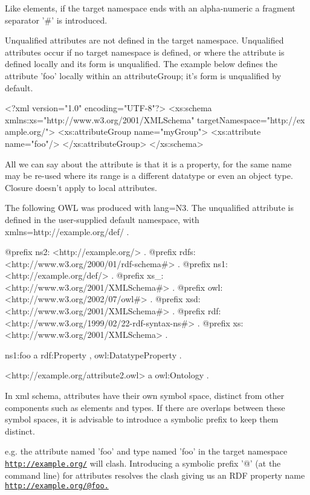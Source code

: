 Like elements, if the target namespace ends with an alpha-\/numeric a fragment separator '\#' is introduced.

Unqualified attributes are not defined in the target namespace. Unqualified attributes occur if no target namespace is defined, or where the attribute is defined locally and its form is unqualified. The example below defines the attribute 'foo' locally within an attributeGroup; it's form is unqualified by default.


\begin{DoxyCodeInclude}
<?xml version="1.0" encoding="UTF-8"?>
<xs:schema xmlns:xs="http://www.w3.org/2001/XMLSchema" targetNamespace="http://ex
      ample.org/">
        <xs:attributeGroup name="myGroup">
                <xs:attribute name="foo"/>
        </xs:attributeGroup>
</xs:schema>
\end{DoxyCodeInclude}


All we can say about the attribute is that it is a property, for the same name may be re-\/used where its range is a different datatype or even an object type. Closure doesn't apply to local attributes.

The following OWL was produced with lang=N3. The unqualified attribute is defined in the user-\/supplied default namespace, with xmlns=http://example.org/def/ .


\begin{DoxyCodeInclude}
@prefix ns2:     <http://example.org/> .
@prefix rdfs:    <http://www.w3.org/2000/01/rdf-schema#> .
@prefix ns1:     <http://example.org/def/> .
@prefix xs_:     <http://www.w3.org/2001/XMLSchema#> .
@prefix owl:     <http://www.w3.org/2002/07/owl#> .
@prefix xsd:     <http://www.w3.org/2001/XMLSchema#> .
@prefix rdf:     <http://www.w3.org/1999/02/22-rdf-syntax-ns#> .
@prefix xs:      <http://www.w3.org/2001/XMLSchema> .

ns1:foo
      a       rdf:Property , owl:DatatypeProperty .

<http://example.org/attribute2.owl>
      a       owl:Ontology .
\end{DoxyCodeInclude}


In xml schema, attributes have their own symbol space, distinct from other components such as elements and types. If there are overlaps between these symbol spaces, it is advisable to introduce a symbolic prefix to keep them distinct.

e.g. the attribute named 'foo' and type named 'foo' in the target namespace \href{http://example.org/}{\tt http://example.org/} will clash. Introducing a symbolic prefix '@' (at the command line) for attributes resolves the clash giving us an RDF property name \href{http://example.org/@foo.}{\tt http://example.org/@foo.}

